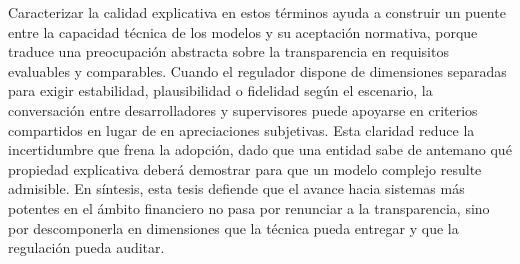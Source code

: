 Caracterizar la calidad explicativa en estos términos ayuda a construir un puente entre la capacidad técnica de los modelos y su aceptación normativa, porque traduce una preocupación abstracta sobre la transparencia en requisitos evaluables y comparables. Cuando el regulador dispone de dimensiones separadas para exigir estabilidad, plausibilidad o fidelidad según el escenario, la conversación entre desarrolladores y supervisores puede apoyarse en criterios compartidos en lugar de en apreciaciones subjetivas. Esta claridad reduce la incertidumbre que frena la adopción, dado que una entidad sabe de antemano qué propiedad explicativa deberá demostrar para que un modelo complejo resulte admisible. En síntesis, esta tesis defiende que el avance hacia sistemas más potentes en el ámbito financiero no pasa por renunciar a la transparencia, sino por descomponerla en dimensiones que la técnica pueda entregar y que la regulación pueda auditar.
